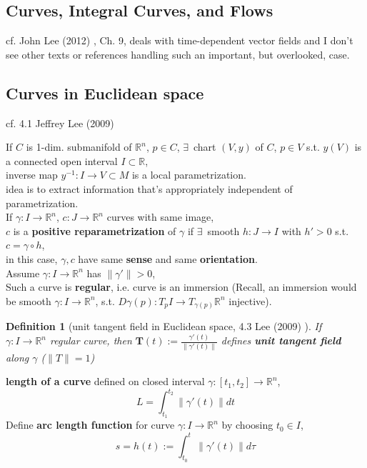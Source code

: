 \documentclass[10pt]{amsart}
\newtheorem{definition}{Definition}
\begin{document}
\begin{multicols*}{2}
\section{Curves, Integral Curves, and Flows}

cf. John Lee (2012) \cite{JLee2012}, Ch. 9, deals with time-dependent vector fields and I don't see other texts or references handling such an important, but overlooked, case.

\subsection{Curves in Euclidean space}

cf. 4.1 Jeffrey Lee (2009) \cite{JLee2009}

If $C$ is 1-dim. submanifold of $\mathbb{R}^n$, $p\in C$, $\exists \, $ chart $(V, y)$ of $C$, $p\in V$ s.t. $y(V)$ is a connected open interval $I \subset \mathbb{R}$, \\
inverse map $y^{-1} : I \to V \subset M$ is a local parametrization. \\
idea is to extract information that's appropriately independent of parametrization. \\

If $\gamma : I \to \mathbb{R}^n$, $c: J \to \mathbb{R}^n$ curves with same image, \\
$c$ is a \textbf{positive reparametrization} of $\gamma$ if $\exists \, $ smooth $h: J \to I$ with $h' > 0 $ s.t. $c = \gamma \circ h$, \\
in this case, $\gamma, c$ have same \textbf{sense} and same \textbf{orientation}. \\

Assume $\gamma : I \to \mathbb{R}^n$ has $\| \gamma' \| >0$, \\
Such a curve is \textbf{regular}, i.e. curve is an immersion (Recall, an immersion would be smooth $\gamma : I \to \mathbb{R}^n$, s.t. $D\gamma(p): T_p I \to T_{\gamma(p)}\mathbb{R}^n$ injective).  

\begin{definition}[unit tangent field in Euclidean space, 4.3 Lee (2009) \cite{JLee2009}]	
	If $\gamma:I \to \mathbb{R}^n$ regular curve, then $\mathbf{T}(t) := \frac{\gamma'(t)}{ \| \gamma'(t) \| }$ defines \textbf{unit tangent field} along $\gamma$ ($\|T \| = 1$)
\end{definition}

\textbf{length of a curve} defined on closed interval $\gamma :[t_1, t_2] \to \mathbb{R}^n$, 
\[
L  = \int_{t_1}^{t_2} \| \gamma'(t) \| dt
\]
Define \textbf{arc length function} for curve $\gamma:I \to \mathbb{R}^n$ by choosing $t_0 \in I$, 
\[
s = h(t) :=  \int_{t_0}^{t} \| \gamma'(t) \| d\tau
\]


\end{multicols*}
\end{document}
